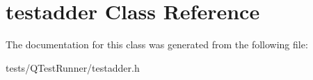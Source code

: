 \hypertarget{classtestadder}{}\section{testadder Class Reference}
\label{classtestadder}


The documentation for this class was generated from the following file\+:\begin{DoxyCompactItemize}
\item 
tests/\+Q\+Test\+Runner/testadder.\+h\end{DoxyCompactItemize}
